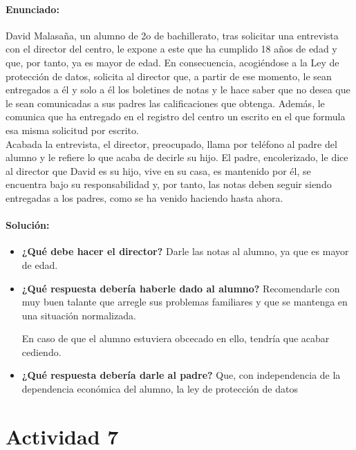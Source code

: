 \paragraph{Enunciado: }

{David Malasaña, un alumno de 2o de bachillerato, tras solicitar una entrevista con el
director del centro, le expone a este que ha cumplido 18 años de edad y que, por
tanto, ya es mayor de edad.
 En consecuencia, acogiéndose a la Ley de protección de
datos, solicita al director que, a partir de ese momento, le sean entregados a él y solo
a él los boletines de notas y le hace saber que no desea que le sean comunicadas a sus
padres las calificaciones que obtenga.
 Además, le comunica que ha entregado en el
registro del centro un escrito en el que formula esa misma solicitud por escrito.
\\
Acabada la entrevista, el director, preocupado, llama por teléfono al padre del alumno
y le refiere lo que acaba de decirle su hijo.
 El padre, encolerizado, le dice al director
que David es su hijo, vive en su casa, es mantenido por él, se encuentra bajo su
responsabilidad y, por tanto, las notas deben seguir siendo entregadas a los padres,
como se ha venido haciendo hasta ahora.

\paragraph{Solución: }

\begin{itemize}
\item \textbf{¿Qué debe hacer el director?}
\subitem Darle las notas al alumno, ya que es mayor de edad.

\item \textbf{¿Qué respuesta debería haberle dado al alumno?}
\subitem Recomendarle con muy buen talante que arregle sus problemas familiares y que se mantenga en una situación normalizada.

%
En caso de que el alumno estuviera obcecado en ello, tendría que acabar cediendo.

\item \textbf{¿Qué respuesta debería darle al padre?}
\subitem Que, con independencia de la dependencia económica del alumno, la ley de protección de datos
\end{itemize}


\newpage
\section*{Actividad 7}
}
